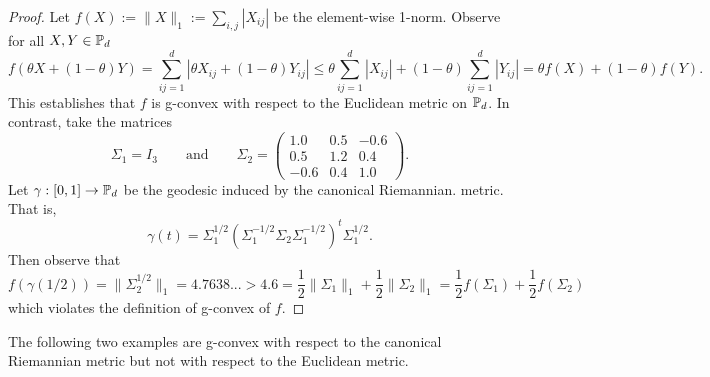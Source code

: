 \documentclass[twoside,11pt]{article}
\begin{document}
\begin{proof}
    Let $f(X) := \|X\|_1 := \sum_{i,j} |X_{ij}|$ be the element-wise 1-norm. Observe for all $X,Y \in \mathbb{P}_d$
\[
f\left(\theta X + (1-\theta) Y\right) = \sum_{ij=1}^d\left | \theta X_{ij} + (1-\theta) Y_{ij}\right| \leq \theta \sum_{ij=1}^d |X_{ij}| + (1-\theta)\sum_{ij=1}^d |Y_{ij}| = \theta f(X) + (1-\theta)f(Y) .
\]
This establishes that $f$ is g-convex with respect to the Euclidean metric on $\mathbb{P}_d$.
In contrast, take the matrices 
\[
\Sigma_1=I_3 \qquad \text{and} \qquad \Sigma_2=\left(\begin{array}{ccc}
1.0 & 0.5 & -0.6 \\
0.5 & 1.2 & 0.4 \\
-0.6 & 0.4 & 1.0
\end{array}\right).
\]
Let $\gamma:[0,1] \to \mathbb{P}_d$ be the geodesic induced by the canonical Riemannian.  metric. That is,
\[
\gamma(t) = \Sigma_1^{1/2}\left(\Sigma_1^{-1/2}\Sigma_2 \Sigma_1^{-1/2}\right)^t \Sigma_1^{1/2}.
\]
Then observe that 
\[
f(\gamma(1/2)) = \|\Sigma_2^{1/2}\|_1 = 4.7638... >  4.6 = \frac{1}{2}\|\Sigma_1\|_1 + \frac{1}{2}\|\Sigma_2\|_1 = \frac{1}{2}f(\Sigma_1) + \frac{1}{2}f(\Sigma_2)
\]
which violates the definition of g-convex of $f$. 
\end{proof}

The following two examples are g-convex with respect to the canonical Riemannian metric but not with respect to the Euclidean metric.
\end{document}
